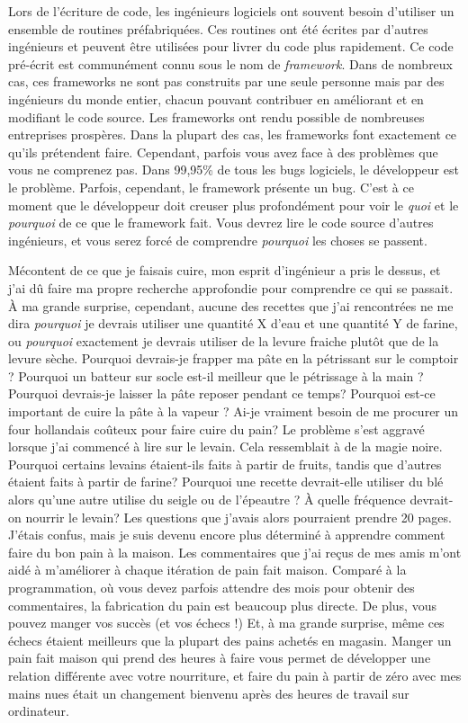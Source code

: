 Lors de l'écriture de code, les ingénieurs logiciels ont souvent besoin d'utiliser un ensemble de routines préfabriquées. Ces routines ont été
écrites par d'autres ingénieurs et peuvent être utilisées pour livrer du code plus rapidement.
Ce code pré-écrit est communément connu sous le nom de \emph{framework}. Dans de nombreux cas,
ces frameworks ne sont pas construits par une seule personne mais par des ingénieurs du monde entier,
chacun pouvant contribuer en améliorant et en modifiant le code source. Les frameworks ont rendu possible de nombreuses entreprises
prospères.
Dans la plupart des cas, les frameworks font exactement ce qu'ils prétendent faire. Cependant,
parfois vous avez face à des problèmes que vous ne comprenez pas. Dans 99,95\% 
de tous les bugs logiciels, le développeur est le problème. Parfois, cependant, le framework présente un
bug. C'est à ce moment que le développeur doit creuser plus profondément pour voir le \emph{quoi} et le
\emph{pourquoi} de ce que
le framework fait. Vous devrez lire le code source d'autres ingénieurs, et vous serez forcé
de comprendre \emph{pourquoi} les choses se passent.

Mécontent de ce que je faisais cuire, mon esprit d'ingénieur a pris le dessus, et j'ai dû
faire ma propre recherche approfondie pour comprendre ce qui se passait. À ma grande surprise, cependant,
aucune des recettes que j'ai rencontrées ne me dira \emph{pourquoi} je devrais utiliser une quantité X
d'eau et une quantité Y de farine, ou \emph{pourquoi} exactement je devrais utiliser de la levure fraiche plutôt que de la levure sèche. Pourquoi
devrais-je frapper ma pâte en la pétrissant sur le comptoir ? Pourquoi un batteur sur socle
est-il meilleur que le pétrissage à la main ? Pourquoi devrais-je laisser la pâte reposer pendant ce temps?
Pourquoi est-ce important de cuire la pâte à la vapeur ? Ai-je vraiment besoin de
me procurer un four hollandais coûteux pour faire cuire du pain?
Le problème s'est aggravé lorsque j'ai commencé à lire sur le levain. Cela ressemblait à de la magie noire.
Pourquoi certains levains étaient-ils faits à partir de fruits, tandis que d'autres étaient faits à partir de farine?
Pourquoi une recette devrait-elle utiliser du blé alors qu'une autre utilise du seigle ou de l'épeautre ? À quelle fréquence devrait-on
nourrir le levain? Les questions que j'avais alors pourraient prendre 20 pages. J'étais confus,
mais je suis devenu encore plus déterminé à apprendre comment faire du bon pain à la maison.
Les commentaires que j'ai reçus de mes amis m'ont aidé à m'améliorer à chaque
itération de pain fait maison. Comparé à la programmation, où vous devez parfois attendre des mois
pour obtenir des commentaires, la fabrication du pain est beaucoup plus directe. De plus, vous pouvez manger vos succès
(et vos échecs !) Et, à ma grande surprise, même ces échecs étaient meilleurs que
la plupart des pains achetés en magasin. Manger un pain fait maison qui prend des heures à faire vous permet
de développer une relation différente avec votre nourriture, et faire du pain à partir de zéro avec mes
mains nues était un changement bienvenu après des heures de travail sur ordinateur.

